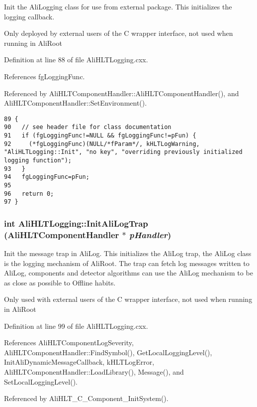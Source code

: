 Init the Ali\-Logging class for use from external package. This initializes the logging callback. \par
 Only deployed by external users of the C wrapper interface, not used when running in Ali\-Root 

Definition at line 88 of file Ali\-HLTLogging.cxx.

References fg\-Logging\-Func.

Referenced by Ali\-HLTComponent\-Handler::Ali\-HLTComponent\-Handler(), and Ali\-HLTComponent\-Handler::Set\-Environment().

\footnotesize\begin{verbatim}89 {
90   // see header file for class documentation
91   if (fgLoggingFunc!=NULL && fgLoggingFunc!=pFun) {
92     (*fgLoggingFunc)(NULL/*fParam*/, kHLTLogWarning, "AliHLTLogging::Init", "no key", "overriding previously initialized logging function");    
93   }
94   fgLoggingFunc=pFun;
95   
96   return 0;
97 }
\end{verbatim}\normalsize 


\subsubsection{\setlength{\rightskip}{0pt plus 5cm}int Ali\-HLTLogging::Init\-Ali\-Log\-Trap ({\bf Ali\-HLTComponent\-Handler} $\ast$ {\em p\-Handler})\hspace{0.3cm}{\tt  [static]}}\label{classAliHLTLogging_e1}


Init the message trap in Ali\-Log. This initializes the Ali\-Log trap, the Ali\-Log class is the logging mechanism of Ali\-Root. The trap can fetch log messages written to Ali\-Log, components and detector algorithms can use the Ali\-Log mechanism to be as close as possible to Offline habits. \par
 Only used with external users of the C wrapper interface, not used when running in Ali\-Root 

Definition at line 99 of file Ali\-HLTLogging.cxx.

References Ali\-HLTComponent\-Log\-Severity, Ali\-HLTComponent\-Handler::Find\-Symbol(), Get\-Local\-Logging\-Level(), Init\-Ali\-Dynamic\-Message\-Callback, k\-HLTLog\-Error, Ali\-HLTComponent\-Handler::Load\-Library(), Message(), and Set\-Local\-Logging\-Level().

Referenced by Ali\-HLT\_\-C\_\-Component\_\-Init\-System().

